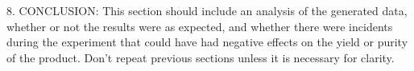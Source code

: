\documentclass[letterpaper,amsmath,amssymb,prb,preprint,12pt]{revtex4-1}%
\begin{document}
8. CONCLUSION: This section should include an analysis of the generated data,
whether or not the results were as expected, and whether there were incidents during
the experiment that could have had negative effects on the yield or purity of the
product. Don’t repeat previous sections unless it is necessary for clarity.


% 
% 
\end{document}

